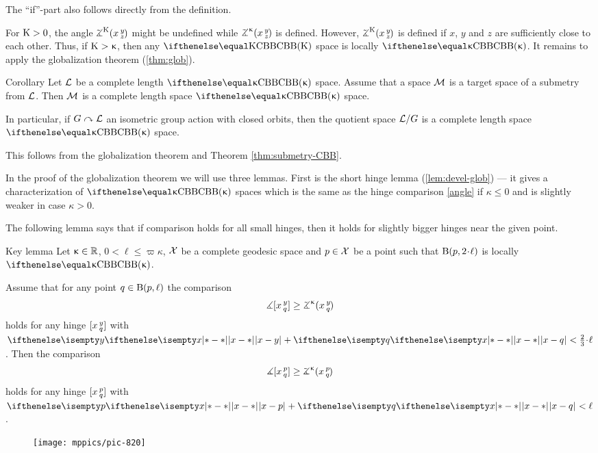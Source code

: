 The ``if''-part also follows directly from the definition.

For $\mathrm{K}>0$, the angle $\angk{\Kappa} x y z$ might be undefined while $\angk{\kappa} x y z$ is defined.
However, $\angk{\Kappa} x y z$ is defined if $x$, $y$ and $z$ are sufficiently close to each other.
Thus, if $\mathrm{K}>\upkappa$, then any $\Alex\Kappa$ space is locally $\Alex\kappa$.
It remains to apply the  globalization theorem (\ref{thm:glob}).
\qeds

\begin{thm}{Corollary}\label{cor:submetry-cbb}
Let $\mathcal{L}$ be a complete length $\Alex\kappa$ space.
Assume that a space  $\mathcal{M}$ is a target space of a submetry from $\mathcal{L}$.
Then $\mathcal{M}$ is a complete length space $\Alex\kappa$ space.

In particular, if $G\curvearrowright \mathcal{L}$ an isometric group action with closed orbits, then the quotient space $\mathcal{L}/G$ is a complete length space $\Alex\kappa$ space.
\end{thm}

This follows from the globalization theorem and Theorem \ref{thm:submetry-CBB}.
\qeds

In the proof of the globalization theorem 
we will use three lemmas.
First is the short hinge lemma (\ref{lem:devel-glob}) --- it gives a characterization of $\Alex\kappa$ spaces which is the same as the hinge comparison \ref{angle} if $\kappa\le 0$ and is slightly weaker in case $\kappa>0$.


The following lemma says that if comparison holds for all small hinges, then it holds for slightly bigger hinges near the given point.

\begin{thm}{Key lemma}\label{key-lem:globalization} 
Let $\kappa\in \RR$, 
$0<\ell\le\varpi\kappa$, 
$\mathcal{X}$ be a complete geodesic space 
and $p\in \spc{X}$ be a point 
such that $\oBall(p,2\cdot\ell)$ is locally $\Alex\kappa$. 

Assume that for any point 
$q\in \oBall(p,{\ell})$ the comparison
\[\mangle\hinge x y q
\ge\angk\kappa x y q\]
holds for any hinge $[x\,{}^{y}_{q}]$ with 
$\dist{x}{y}{}+\dist{x}{q}{}
<
\frac{2}{3}\cdot\ell$.
Then the comparison
\[\mangle\hinge x p q
\ge\angk\kappa x p q\] 
holds for any hinge $[x\,{}^{p}_{q}]$ with $\dist{x}{ p}{}+\dist{x}{q}{}<\ell$.
\end{thm}

\begin{wrapfigure}{r}{30 mm}
\vskip-0mm
\centering
\texttt{[image: mppics/pic-820]}
\end{wrapfigure}


